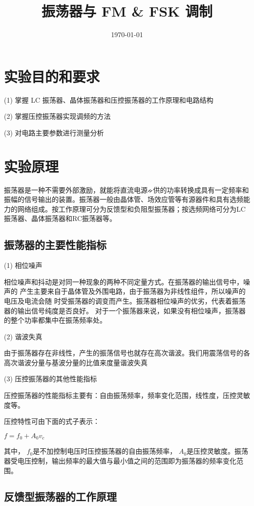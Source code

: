 \documentclass{../source/Experiment}
\title{振荡器与 FM \& FSK 调制}
\date{\today}
\begin{document}
    \section{实验目的和要求}
    (1) 掌握 LC 振荡器、晶体振荡器和压控振荡器的工作原理和电路结构

    (2) 掌握压控振荡器实现调频的方法

    (3) 对电路主要参数进行测量分析


    \section{实验原理}
    振荡器是一种不需要外部激励，就能将直流电源ᨀ供的功率转换成具有一定频率和振幅的信号输出的装置。振荡器一般由晶体管、场效应管等有源器件和具有选频能力的网络组成。按工作原理可分为反馈型和负阻型振荡器；按选频网络可分为LC振荡器、晶体振荡器和RC振荡器等。

        \subsection{振荡器的主要性能指标}

        (1) 相位噪声
        
        相位噪声和抖动是对同一种现象的两种不同定量方式。在振荡器的输出信号中，噪声的
        产生主要来自于晶体管及外围电路，由于振荡器为非线性组件，所以噪声的电压及电流会随
        时受振荡器的调变而产生。振荡器相位噪声的优劣，代表着振荡器的输出信号纯度是否良好。
        对于一个振荡器来说，如果没有相位噪声，振荡器的整个功率都集中在振荡频率处。
        
        (2) 谐波失真
        
        由于振荡器存在非线性，产生的振荡信号也就存在高次谐波。我们用震荡信号的各高次谐波分量与基波分量的比值来度量谐波失真

        (3) 压控振荡器的其他性能指标

        压控振荡器的性能指标主要有：自由振荡频率，频率变化范围，线性度，压控灵敏度等。

        压控特性可由下面的式子表示：

        $f = f_0 + A_0v_c$


        其中， $f_0$是不加控制电压时压控振荡器的自由振荡频率， $A_0 $是压控灵敏度。振荡器受电压控制，输出频率的最大值与最小值之间的范围即为振荡器的频率变化范围。

        \subsection{反馈型振荡器的工作原理}
\end{document}
